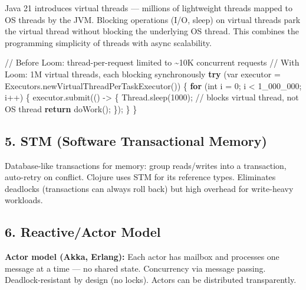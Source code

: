 \documentclass[11pt]{article}
\newenvironment{Shaded}{\begin{snugshade}}{\end{snugshade}}
\newcommand{\BuiltInTok}[1]{\textcolor[rgb]{0.50,0.55,0.55}{#1}}
\newcommand{\CommentTok}[1]{\textcolor[rgb]{0.48,0.49,0.49}{#1}}
\newcommand{\ControlFlowTok}[1]{\textcolor[rgb]{0.99,0.74,0.29}{\textbf{#1}}}
\newcommand{\DataTypeTok}[1]{\textcolor[rgb]{0.16,0.50,0.73}{#1}}
\newcommand{\DecValTok}[1]{\textcolor[rgb]{0.96,0.45,0.00}{#1}}
\newcommand{\FunctionTok}[1]{\textcolor[rgb]{0.56,0.27,0.68}{#1}}
\newcommand{\NormalTok}[1]{\textcolor[rgb]{0.81,0.81,0.76}{#1}}
\newcommand{\OperatorTok}[1]{\textcolor[rgb]{0.81,0.81,0.76}{#1}}
\begin{document}
Java 21 introduces virtual threads --- millions of lightweight threads mapped to OS threads by the JVM. Blocking operations (I/O, sleep) on virtual threads park the virtual thread without blocking the underlying OS thread. This combines the programming simplicity of threads with async scalability.


\begin{Shaded}
\begin{Highlighting}[]
\CommentTok{// Before Loom: thread{-}per{-}request limited to \textasciitilde{}10K concurrent requests}
\CommentTok{// With Loom: 1M virtual threads, each blocking synchronously}
\ControlFlowTok{try} \OperatorTok{(}\DataTypeTok{var}\NormalTok{ executor }\OperatorTok{=} \BuiltInTok{Executors}\OperatorTok{.}\FunctionTok{newVirtualThreadPerTaskExecutor}\OperatorTok{())} \OperatorTok{\{}
    \ControlFlowTok{for} \OperatorTok{(}\DataTypeTok{int}\NormalTok{ i }\OperatorTok{=} \DecValTok{0}\OperatorTok{;}\NormalTok{ i }\OperatorTok{\textless{}} \DecValTok{1\_000\_000}\OperatorTok{;}\NormalTok{ i}\OperatorTok{++)} \OperatorTok{\{}
\NormalTok{        executor}\OperatorTok{.}\FunctionTok{submit}\OperatorTok{(()} \OperatorTok{{-}\textgreater{}} \OperatorTok{\{}
            \BuiltInTok{Thread}\OperatorTok{.}\FunctionTok{sleep}\OperatorTok{(}\DecValTok{1000}\OperatorTok{);}  \CommentTok{// blocks virtual thread, not OS thread}
            \ControlFlowTok{return} \FunctionTok{doWork}\OperatorTok{();}
        \OperatorTok{\});}
    \OperatorTok{\}}
\OperatorTok{\}}
\end{Highlighting}
\end{Shaded}

\subsection{5. STM (Software Transactional Memory)}\label{5-stm-software-transactional-memory}

Database-like transactions for memory: group reads/writes into a transaction, auto-retry on conflict. Clojure uses STM for its reference types. Eliminates deadlocks (transactions can always roll back) but high overhead for write-heavy workloads.

\subsection{6. Reactive/Actor Model}\label{6-reactiveactor-model}

\textbf{Actor model (Akka, Erlang):} Each actor has mailbox and processes one message at a time --- no shared state. Concurrency via message passing. Deadlock-resistant by design (no locks). Actors can be distributed transparently.
\end{document}
